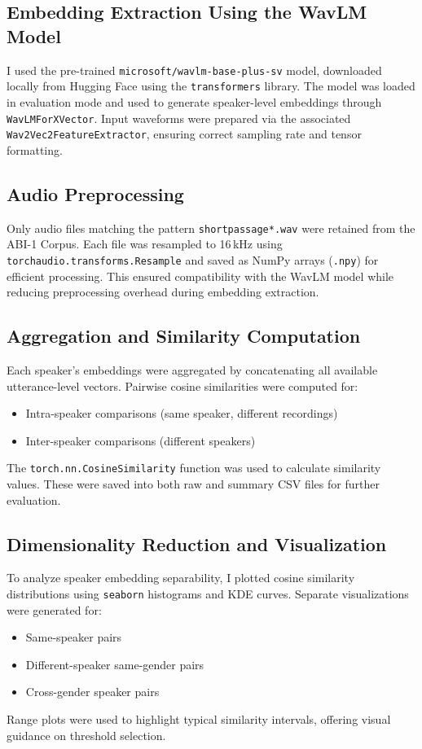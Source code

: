 \documentclass[conference]{IEEEtran}
\begin{document}
\subsection*{Embedding Extraction Using the WavLM Model}
I used the pre-trained \texttt{microsoft/wavlm-base-plus-sv} model, downloaded locally from Hugging Face using the \texttt{transformers} library. The model was loaded in evaluation mode and used to generate speaker-level embeddings through \texttt{WavLMForXVector}. Input waveforms were prepared via the associated \texttt{Wav2Vec2FeatureExtractor}, ensuring correct sampling rate and tensor formatting.

\subsection*{Audio Preprocessing}
Only audio files matching the pattern \texttt{shortpassage*.wav} were retained from the ABI-1 Corpus. Each file was resampled to 16\,kHz using \texttt{torchaudio.transforms.Resample} and saved as NumPy arrays (\texttt{.npy}) for efficient processing. This ensured compatibility with the WavLM model while reducing preprocessing overhead during embedding extraction.

\subsection*{Aggregation and Similarity Computation}
Each speaker’s embeddings were aggregated by concatenating all available utterance-level vectors. Pairwise cosine similarities were computed for:
\begin{itemize}
	\item Intra-speaker comparisons (same speaker, different recordings)
	\item Inter-speaker comparisons (different speakers)
\end{itemize}
The \texttt{torch.nn.CosineSimilarity} function was used to calculate similarity values. These were saved into both raw and summary CSV files for further evaluation.

\subsection*{Dimensionality Reduction and Visualization}
To analyze speaker embedding separability, I plotted cosine similarity distributions using \texttt{seaborn} histograms and KDE curves. Separate visualizations were generated for:
\begin{itemize}
	\item Same-speaker pairs
	\item Different-speaker same-gender pairs
	\item Cross-gender speaker pairs
\end{itemize}
Range plots were used to highlight typical similarity intervals, offering visual guidance on threshold selection.
\end{document}
